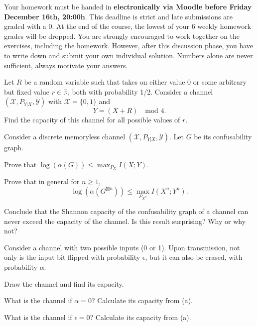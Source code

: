 \documentclass[a4paper,10pt,landscape,twocolumn]{scrartcl}
\newcommand\deadline{Friday December 16th, 20:00h}
\begin{document}
\homeworkproblems

{\sffamily\noindent
Your homework must be handed in \textbf{electronically via Moodle before \deadline}. This deadline is strict and late submissions are graded with a 0. At the end of the course, the lowest of your 6 weekly homework grades will be dropped. You are strongly encouraged to work together on the exercises, including the homework. However, after this discussion phase, you have to write down and submit your own individual solution. Numbers alone are never sufficient, always motivate your answers.
}

\begin{exercise}
Let $R$ be a random variable such that takes on either value 0 or some arbitrary but fixed value $r \in \mathbb{R}$, both with probability 1/2. Consider a channel $(\mathcal{X},P_{Y|X},\mathcal{Y})$ with $\mathcal{X} = \{0,1\}$ and 
\[Y = (X + R) \quad \mbox{mod 4}. \]
Find the capacity of this channel for all possible values of $r$.
\end{exercise}


\begin{exercise}
Consider a discrete memoryless channel $(\mathcal{X}, P_{Y|X}, \mathcal{Y})$. Let $G$ be its confusability graph.
\begin{subex}[(2pt)]
Prove that $\log(\alpha(G)) \leq \max_{P_X} I(X;Y)$.
\end{subex}
\begin{subex}[(2pt)]
Prove that in general for $n \geq 1$, \[\log(\alpha(G^{\boxtimes n})) \leq \max_{P_{X^n}} I(X^n ; Y^n).\]
\end{subex}
\begin{subex}[(1pt)]
Conclude that the Shannon capacity of the confusability graph of a channel can never exceed the capacity of the channel. Is this result surprising? Why or why not?
\end{subex}

\end{exercise}

\begin{exercise}
Consider a channel with two possible inputs (0 or 1). Upon transmission, not only is the input bit flipped with probability $\epsilon$, but it can also be erased, with probability $\alpha$.
	\begin{subex}[(3pt)]
	Draw the channel and find its capacity.
	\end{subex}
	\begin{subex}[(1pt)]
	What is the channel if $\alpha = 0$? Calculate its capacity from (a).
	\end{subex}
	\begin{subex}[(1pt)]
	What is the channel if $\epsilon = 0$? Calculate its capacity from (a).
	\end{subex}
\end{exercise}
\end{document}
